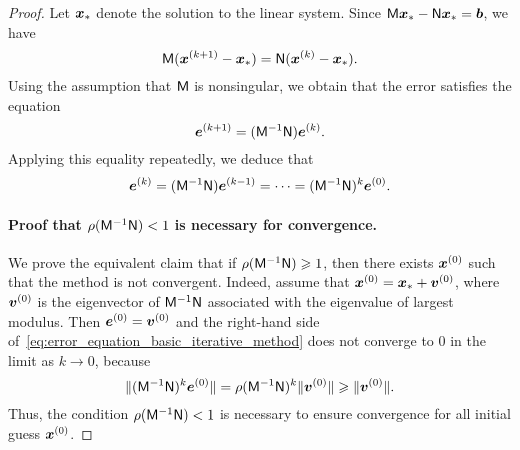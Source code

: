\begin{proof}
    Let $\mathbf{\boldsymbol{x}}_*$ denote the solution to the linear system.
    Since $\mathsf M \mathbf{\boldsymbol{x}}_* - \mathsf N \mathbf{\boldsymbol{x}}_* = \mathbf{\boldsymbol{b}}$,
    we have
    \[
        \mathsf M (\mathbf{\boldsymbol{x}}^{(k+1)} - \mathbf{\boldsymbol{x}}_*) = \mathsf N (\mathbf{\boldsymbol{x}}^{(k)} - \mathbf{\boldsymbol{x}}_*).
    \]
    Using the assumption that $\mathsf M$ is nonsingular,
    we obtain that the error satisfies the equation
    \[
        \mathbf{\boldsymbol{e}}^{(k+1)} = (\mathsf M^{-1} \mathsf N) \mathbf{\boldsymbol{e}}^{(k)}.
    \]
    Applying this equality repeatedly,
    we deduce that
    \begin{equation}
        \label{eq:error_equation_basic_iterative_method}
        \mathbf{\boldsymbol{e}}^{(k)} = (\mathsf M^{-1} \mathsf N) \mathbf{\boldsymbol{e}}^{(k-1)} = \dots = (\mathsf M^{-1} \mathsf N)^{k} \mathbf{\boldsymbol{e}}^{(0)}.
    \end{equation}

    \paragraph{Proof that $\rho(\mathsf M^{-1} \mathsf N) < 1$ is necessary for convergence.}
    We prove the equivalent claim that if $\rho(\mathsf M^{-1} \mathsf N) \geqslant 1$,
    then there exists $\mathbf{\boldsymbol{x}}^{(0)}$ such that the method is not convergent.
    Indeed, assume that $\mathbf{\boldsymbol{x}}^{(0)} = \mathbf{\boldsymbol{x}}_* + \mathbf{\boldsymbol{v}}^{(0)}$,
    where $\mathbf{\boldsymbol{v}}^{(0)}$ is the eigenvector of $\mathsf M^{-1} \mathsf N$ associated with the eigenvalue of largest modulus.
    Then $\mathbf{\boldsymbol{e}}^{(0)} = \mathbf{\boldsymbol{v}}^{(0)}$ and the right-hand side of~\eqref{eq:error_equation_basic_iterative_method} does not converge to 0 in the limit as $k \to 0$,
    because
    \[
        \lVert(\mathsf M^{-1} \mathsf N)^{k} \mathbf{\boldsymbol{e}}^{(0)}\rVert = \rho(\mathsf M^{-1} \mathsf N)^k \lVert\mathbf{\boldsymbol{v}}^{(0)}\rVert \geqslant \lVert\mathbf{\boldsymbol{v}}^{(0)}\rVert.
    \]
    Thus, the condition $\rho(\mathsf M^{-1} \mathsf N) < 1 $ is necessary to ensure convergence for all initial guess $\mathbf{\boldsymbol{x}}^{(0)}$.


\end{proof}
